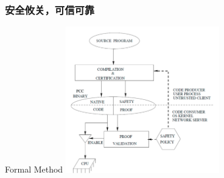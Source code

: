 \begin{frame}
\frametitle{安全攸关，可信可靠}
\begin{block}{Formal Method}
\centering
\includegraphics[width=0.5\textwidth]{fig23/formal2.jpg}
\end{block}
\end{frame}

